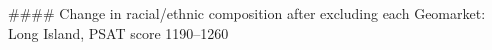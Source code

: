 #### Change in racial/ethnic composition after excluding each Geomarket: Long Island, PSAT score 1190–1260
